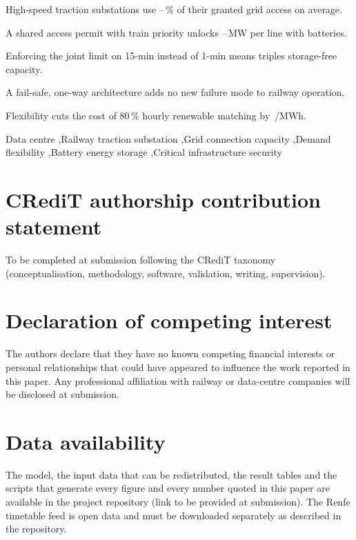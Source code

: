 \documentclass[preprint,review,12pt]{elsarticle}
\begin{document}
\begin{frontmatter}
\begin{highlights}
\item High-speed traction substations use \msUsePct--\mzbUsePct\,\% of their granted grid access on average.
\item A shared access permit with train priority unlocks \mzbBat--\msBat\,MW per line with batteries.
\item Enforcing the joint limit on 15-min instead of 1-min means triples storage-free capacity.
\item A fail-safe, one-way architecture adds no new failure mode to railway operation.
\item Flexibility cuts the cost of 80\,\% hourly renewable matching by \resFlexValue\,\texteuro/MWh.
\end{highlights}

\begin{keyword}
Data centre \sep Railway traction substation \sep Grid connection capacity \sep Demand flexibility \sep Battery energy storage \sep Critical infrastructure security
\end{keyword}

\end{frontmatter}








\section*{CRediT authorship contribution statement}
To be completed at submission following the CRediT taxonomy (conceptualisation, methodology, software, validation, writing, supervision).

\section*{Declaration of competing interest}
The authors declare that they have no known competing financial interests or personal relationships that could have appeared to influence the work reported in this paper. Any professional affiliation with railway or data-centre companies will be disclosed at submission.

\section*{Data availability}
The model, the input data that can be redistributed, the result tables and the scripts that generate every figure and every number quoted in this paper are available in the project repository (link to be provided at submission). The Renfe timetable feed is open data and must be downloaded separately as described in the repository.
\end{document}
